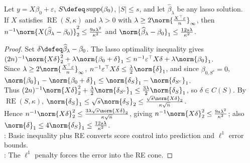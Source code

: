 \begin{theorem} \label{thm:lasso-basic-rate-form} \\
Let $y=X\beta_0+\varepsilon$, $S\defeq\operatorname{supp}(\beta_0)$, $|S|\leq s$, and let $\widehat{\beta}_\lambda$ be any lasso solution.\\
If $X$ satisfies $\operatorname{RE}(S,\kappa)$ and $\lambda>0$ with $\lambda\geq2\norm{\frac{X^\top\varepsilon}{n}}_\infty$, then $n^{-1}\norm{X(\widehat{\beta}_\lambda-\beta_0)}_2^2\leq\frac{9s\lambda^2}{\kappa^2}$ and $\norm{\widehat{\beta}_\lambda-\beta_0}_1\leq\frac{12s\lambda}{\kappa^2}$.
\begin{proof} Set $\delta\defeq\widehat{\beta}_\lambda-\beta_0$. The lasso optimality inequality gives $(2n)^{-1}\norm{X\delta}_2^2+\lambda\norm{\beta_0+\delta}_1\leq n^{-1}\varepsilon^\top X\delta+\lambda\norm{\beta_0}_1$.\\
Since $\lambda\geq2\norm{\frac{X^\top\varepsilon}{n}}_\infty$, $n^{-1}\varepsilon^\top X\delta\leq\frac{\lambda}{2}\norm{\delta}_1$, and since $\beta_{0,S^c}=0$, $\norm{\beta_0}_1-\norm{\beta_0+\delta}_1\leq\norm{\delta_S}_1-\norm{\delta_{S^c}}_1$.\\
Thus $(2n)^{-1}\norm{X\delta}_2^2+\frac{\lambda}{2}\norm{\delta_{S^c}}_1\leq\frac{3\lambda}{2}\norm{\delta_S}_1$, so $\delta\in C(S)$. By $\operatorname{RE}(S,\kappa)$, $\norm{\delta_S}_1\leq\sqrt{s}\norm{\delta_S}_2\leq\frac{\sqrt{s}\norm{X\delta}_2}{\kappa\sqrt{n}}$.\\
Hence $n^{-1}\norm{X\delta}_2^2\leq\frac{3\lambda\sqrt{s}\norm{X\delta}_2}{\kappa\sqrt{n}}$, giving $n^{-1}\norm{X\delta}_2^2\leq\frac{9s\lambda^2}{\kappa^2}$; also $\norm{\delta}_1\leq4\norm{\delta_S}_1\leq\frac{12s\lambda}{\kappa^2}$.\\
: Basic inequality plus RE converts score control into prediction and $\ell^1$ error bounds.\\
: The $\ell^1$ penalty forces the error into the RE cone.
\end{proof}
\end{theorem}

